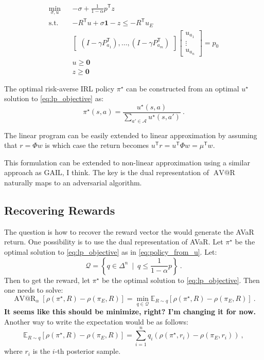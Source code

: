 \documentclass{article}
\makeatletter
\newcommand{\tr}{^\mathsf{T}}
\DeclareMathOperator{\avar}{AV@R}
\newcommand{\Ex}{\mathbb{E}}
\newcommand{\one}{\mathbf{1}}
\newcommand{\zero}{\mathbf{0}}
\newcommand{\opt}{^{\star}}
\makeatother
\begin{document}
\begin{eqnarray}
\min_{\sigma, u}&& -\sigma + \frac{1}{1-\alpha}p\tr z \\
\text{s.t.}&& - R\tr u + \sigma \one  - z  \leq -R\tr u_E\\
&&\begin{bmatrix}
(I - \gamma P_{a_1}\tr), \ldots, (I - \gamma P_{a_m}\tr)
\end{bmatrix}
\begin{bmatrix}
u_{a_1} \\
\vdots\\
u_{a_n}
\end{bmatrix}
= p_0 \\
&& u \geq \zero \\
&& z \geq \zero 
\end{eqnarray}	
	
	
	The optimal risk-averse IRL policy $\pi\opt$ can be constructed from an optimal $u\opt$ solution to \eqref{eq:lp_objective} as:
	\begin{equation} \label{eq:policy_from_u}
	\pi\opt(s,a) = \frac{u\opt(s,a)}{\sum_{a'\in\mathcal{A}} u\opt(s,a') }~. 
	\end{equation}
	
	
	The linear program can be easily extended to linear approximation by assuming that $r = \Phi w$ is which case the return becomes $u\tr r = u\tr \Phi w = \mu\tr w$.
	
	This formulation can be extended to non-linear approximation using a similar approach as GAIL, I think. The key is the dual representation of $\avar$ naturally maps to an adversarial algorithm. 

\subsection{Recovering Rewards}

The question is how to recover the reward vector the would generate the AVaR return. One possibility is to use the dual representation of AVaR. Let $\pi\opt$ be the optimal solution to \eqref{eq:lp_objective} as in \eqref{eq:policy_from_u}. Let:
\[ \mathcal{Q} = \left\{ q \in \Delta^n ~\mid~ q \le \frac{1}{1-\alpha} p \right\} ~. \]
Then to get the reward, let $\pi\opt$ be the optimal solution to \eqref{eq:lp_objective}. Then one needs to solve:
\begin{equation} \label{eq:q_value}
\avar_\alpha\left[ \rho(\pi\opt, R) - \rho(\pi_E, R) \right] = \min_{q\in\mathcal{Q}} \Ex_{R \sim q} \left[ \rho(\pi\opt, R) - \rho(\pi_E, R) \right]~.
\end{equation}
\textbf{It seems like this should be minimize, right? I'm changing it for now.}
Another way to write the expectation would be as follows:
\[ \Ex_{R \sim q} \left[ \rho(\pi\opt, R) - \rho(\pi_E, R) \right] = \sum_{i=1}^n q_i \left( \rho(\pi\opt, r_i) - \rho(\pi_E, r_i) \right)~, \]
where $r_i$ is the $i$-th posterior sample.
\end{document}
